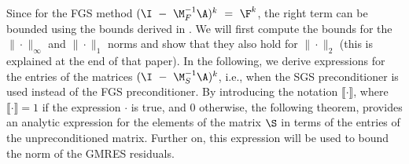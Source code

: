 Since for the FGS method $(\I~-~\M_F^{-1}\A)^k~=~\F^k$, the right term can be
bounded using the bounds derived in \cite[Section 5]{ElmChe93}. We will
first compute the bounds for the $\|\cdot\|_\infty$ and $\|\cdot\|_1$ norms and
show that they also hold for $\|\cdot\|_2$ (this is explained at the end of
that paper). In the following, we derive expressions for the entries of the
matrices $(\I~-~\M_S^{-1}\A)^k$, i.e., when the SGS preconditioner is used instead
of the FGS preconditioner. By introducing the notation $\llbracket \cdot
\rrbracket$, where  $\llbracket \cdot \rrbracket=1$ if the expression $\cdot$
is true, and $0$ otherwise, the following theorem, provides an analytic
expression for the elements of the matrix $\S$ in terms of the entries of the
unpreconditioned matrix. Further on,  this expression will be used to bound the
norm of the GMRES residuals.

